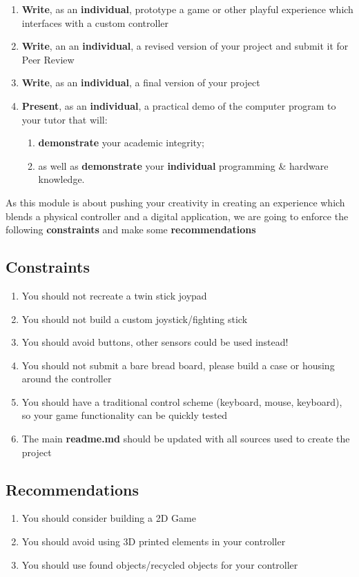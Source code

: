 \documentclass{../../fal_assignment}
\begin{document}
	
	\begin{enumerate}[label=(\Alph*)]
		\item \textbf{Write}, as an \textbf{individual}, prototype a game or other playful experience which interfaces with a custom controller
		\item \textbf{Write}, an an \textbf{individual}, a revised version of your project and submit it for Peer Review
		\item \textbf{Write}, as an \textbf{individual}, a final version of your project
		\item \textbf{Present}, as an \textbf{individual}, a practical demo of the computer program to your tutor that will:
		\begin{enumerate}[label=\roman*.]
			\item \textbf{demonstrate} your academic integrity;
			\item as well as \textbf{demonstrate} your \textbf{individual} programming \& hardware knowledge.
		\end{enumerate}
	\end{enumerate}


	As this module is about pushing your creativity in creating an experience which blends a physical controller and a digital application, we are going to enforce the following \textbf{constraints} and make some \textbf{recommendations}
	
	\subsection*{Constraints}
	\begin{enumerate}
		\item You should not recreate a twin stick joypad
		\item You should not build a custom joystick/fighting stick
		\item You should avoid buttons, other sensors could be used instead!
		\item You should not submit a bare bread board, please build a case or housing around the controller
		\item You should have a traditional control scheme (keyboard, mouse, keyboard), 
		so your game functionality can be quickly tested 
		\item The main \textbf{readme.md} should be updated with all sources used to create the project
	\end{enumerate}
	
	\subsection*{Recommendations}
	\begin{enumerate}
		\item You should consider building a 2D Game
		\item You should avoid using 3D printed elements in your controller
		\item You should use found objects/recycled objects for your controller
	\end{enumerate}
	
\end{document}
